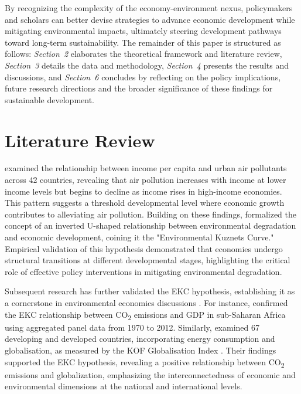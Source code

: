 \documentclass[10pt]{article}
\begin{document}
By recognizing the complexity of the economy-environment nexus, policymakers and scholars can better devise strategies to advance economic development while mitigating environmental impacts, ultimately steering development pathways toward long-term sustainability. The remainder of this paper is structured as follows: \textit{Section~2} elaborates the theoretical framework and literature review, \textit{Section~3} details the data and methodology, \textit{Section~4} presents the results and discussions, and \textit{Section~6} concludes by reflecting on the policy implications, future research directions and the broader significance of these findings for sustainable development.

\section{Literature Review}

\cite{GrossmanEKCKrueger} examined the relationship between income per capita and urban air pollutants across 42 countries, revealing that air pollution increases with income at lower income levels but begins to decline as income rises in high-income economies. This pattern suggests a threshold developmental level where economic growth contributes to alleviating air pollution. Building on these findings, \cite{panayotouEnvironmentalDegradationDifferent1995} formalized the concept of an inverted U-shaped relationship between environmental degradation and economic development, coining it the "Environmental Kuznets Curve." Empirical validation of this hypothesis demonstrated that economies undergo structural transitions at different developmental stages, highlighting the critical role of effective policy interventions in mitigating environmental degradation.

Subsequent research has further validated the EKC hypothesis, establishing it as a cornerstone in environmental economics discussions \citep{lealEvolutionEnvironmentalKuznets2022}. For instance, \cite{adzawlaGreenhouseGassesEmission2019} confirmed the EKC relationship between CO\textsubscript{2} emissions and GDP in sub-Saharan Africa using aggregated panel data from 1970 to 2012. Similarly, \cite{xiaInvestigatingRoleGlobalization2022} examined 67 developing and developed countries, incorporating energy consumption and globalisation, as measured by the KOF Globalisation Index \citep{KOFGlobalisationIndex}. Their findings supported the EKC hypothesis, revealing a positive relationship between CO\textsubscript{2} emissions and globalization, emphasizing the interconnectedness of economic and environmental dimensions at the national and international levels.
\end{document}
